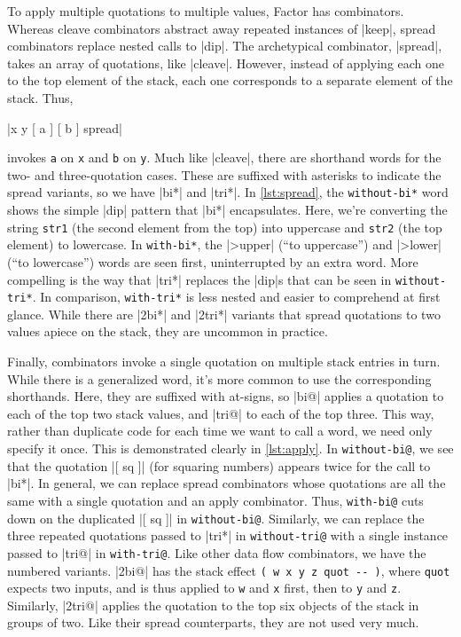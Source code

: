 To apply multiple quotations to multiple values, Factor has 
combinators.  Whereas cleave combinators abstract away repeated instances of
\factor|keep|, spread combinators replace nested calls to \factor|dip|.  The
archetypical combinator, \factor|spread|, takes an array of quotations, like
\factor|cleave|.  However, instead of applying each one to the top element of
the stack, each one corresponds to a separate element of the stack.  Thus,
%
\begin{center} \factor|x y { [ a ] [ b ] } spread| \end{center}
%
invokes \Verb|a| on \Verb|x| and \Verb|b| on \Verb|y|.  Much like
\factor|cleave|, there are shorthand words for the two- and three-quotation
cases.  These are suffixed with asterisks to indicate the spread variants, so
we have \factor|bi*| and \factor|tri*|.  In \vref{lst:spread}, the
\Verb|without-bi*| word shows the simple \factor|dip| pattern that \factor|bi*|
encapsulates.  Here, we're converting the string \Verb|str1| (the second
element from the top) into uppercase and \Verb|str2| (the top element) to
lowercase.  In \Verb|with-bi*|, the \factor|>upper| (``to uppercase'') and
\factor|>lower| (``to lowercase'') words are seen first, uninterrupted by an
extra word.  More compelling is the way that \factor|tri*| replaces the
\factor|dip|s that can be seen in \Verb|without-tri*|.  In comparison,
\Verb|with-tri*| is less nested and easier to comprehend at first glance.
While there are \factor|2bi*| and \factor|2tri*| variants that spread
quotations to two values apiece on the stack, they are uncommon in practice.


Finally,  combinators invoke a single quotation on multiple stack
entries in turn.  While there is a generalized word, it's more common to use
the corresponding shorthands.  Here, they are suffixed with at-signs, so
\factor|bi@| applies a quotation to each of the top two stack values, and
\factor|tri@| to each of the top three.  This way, rather than duplicate code
for each time we want to call a word, we need only specify it once.  This is
demonstrated clearly in \vref{lst:apply}.  In \Verb|without-bi@|, we see that
the quotation \factor|[ sq ]| (for squaring numbers) appears twice for the call
to \factor|bi*|.  In general, we can replace spread combinators whose
quotations are all the same with a single quotation and an apply combinator.
Thus, \Verb|with-bi@| cuts down on the duplicated \factor|[ sq ]| in
\Verb|without-bi@|.  Similarly, we can replace the three repeated quotations
passed to \factor|tri*| in \Verb|without-tri@| with a single instance passed
to \factor|tri@| in \Verb|with-tri@|.  Like other data flow combinators, we
have the numbered variants.  \factor|2bi@| has the stack effect
%
\Verb|( w x y z quot -- )|,
%
where \Verb|quot| expects two inputs, and is thus applied to \Verb|w| and
\Verb|x| first, then to \Verb|y| and \Verb|z|.  Similarly, \factor|2tri@|
applies the quotation to the top six objects of the stack in groups of two.
Like their spread counterparts, they are not used very much.

